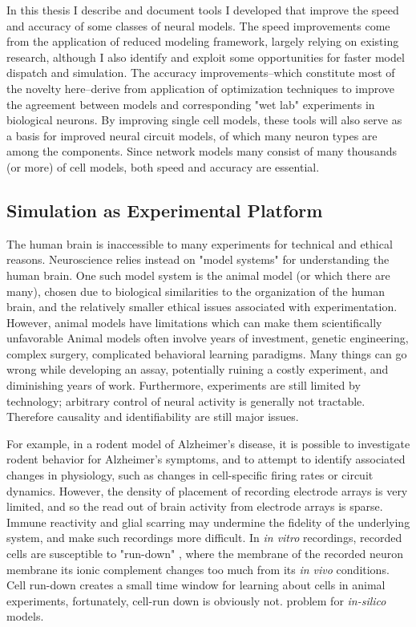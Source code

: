 In this thesis I describe and document tools I developed that improve the speed and accuracy of some classes of neural models.
The speed improvements come from the application of reduced modeling framework, largely relying on existing research, although I also identify and exploit some opportunities for faster model dispatch and simulation.
The accuracy improvements--which constitute most of the novelty here--derive from application of optimization techniques to improve the agreement between models and corresponding "wet lab" experiments in biological neurons.
By improving single cell models, these tools will also serve as a basis for improved neural circuit models, of which many neuron types are among the components.
Since network models many consist of many thousands (or more) of cell models, both speed and accuracy are essential.
\\

\subsection{Simulation as Experimental Platform}
The human brain is inaccessible to many experiments for technical and ethical reasons.
Neuroscience relies instead on "model systems" for understanding the human brain.
One such model system is the animal model (or which there are many), chosen due to biological similarities to the organization of the human brain, and the relatively smaller ethical issues associated with experimentation.
However, animal models have limitations which can make them scientifically unfavorable
Animal models often involve years of investment, genetic engineering, complex surgery, complicated behavioral learning paradigms.
Many things can go wrong while developing an assay, potentially ruining a costly experiment, and diminishing years of work.
Furthermore, experiments are still limited by technology; arbitrary control of neural activity is generally not tractable.
Therefore causality and identifiability are still major issues.

For example, in a rodent model of Alzheimer's disease, it is possible to investigate rodent behavior for Alzheimer's symptoms, and to attempt to identify associated changes in physiology, such as changes in cell-specific firing rates or circuit dynamics.
However, the density of placement of recording electrode arrays is very limited, and so the read out of brain activity from electrode arrays is sparse.
Immune reactivity and glial scarring may undermine the fidelity of the underlying system, and make such recordings more difficult.
In \emph{in vitro} recordings, recorded cells are susceptible to "run-down" \cite{colquhoun1994ion}, where the membrane of the recorded neuron membrane its ionic complement changes too much from its \emph{in vivo} conditions. 
Cell run-down creates a small time window for learning about cells in animal experiments, fortunately, cell-run down is obviously not. problem for \emph{in-silico} models.

